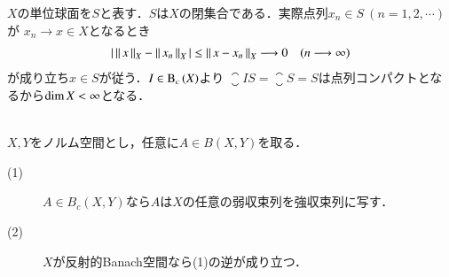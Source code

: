 	\begin{prf}
		$X$の単位球面を$S$と表す．$S$は$X$の閉集合である．実際点列$x_n \in S\ (n=1,2,\cdots)$が
		$x_n \rightarrow x \in X$となるとき
		\begin{align}
			\left|\, \left\|\, x\, \right\|_{X} - \left\|\, x_n\, \right\|_{X}\, \right| \leq \left\|\, x - x_n\, \right\|_{X} \longrightarrow 0
			\quad (n \longrightarrow \infty)
		\end{align}
		が成り立ち$x \in S$が従う．$I \in \mathrm{B}_c\left(X\right) $より
		$\closure{IS} = \closure{S} = S$は点列コンパクトとなるから$\operatorname{dim} X < \infty$となる．
		\QED
	\end{prf}
	
	\begin{screen}
		\begin{thm}[コンパクト作用素は弱収束列を強収束列に写す]\mbox{}\\
			$X,Y$をノルム空間とし，任意に$A \in B(X,Y)$を取る．
			\begin{description}
				\item[(1)] $A \in B_c(X,Y)$なら$A$は$X$の任意の弱収束列を強収束列に写す．
				\item[(2)] $X$が反射的Banach空間なら(1)の逆が成り立つ．
			\end{description}
		\end{thm}
	\end{screen}
	
